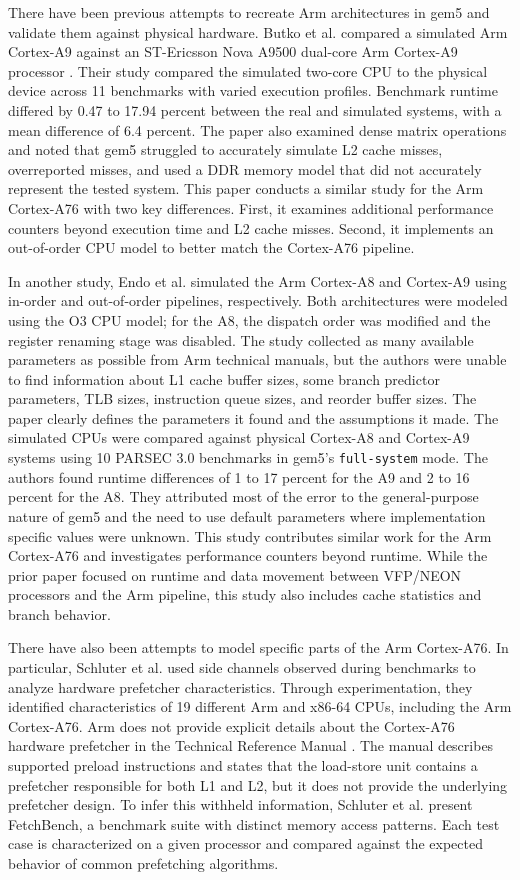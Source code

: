 \documentclass[acmlarge]{acmart}
\begin{document}
There have been previous attempts to recreate Arm architectures in gem5 and
validate them against physical hardware. Butko et al. compared a simulated Arm
Cortex-A9 against an ST-Ericsson Nova A9500 dual-core Arm Cortex-A9 processor
\cite{Butko2012-vg}. Their study compared the simulated two-core CPU to the
physical device across 11 benchmarks with varied execution profiles. Benchmark
runtime differed by 0.47 to 17.94 percent between the real and simulated systems,
with a mean difference of 6.4 percent. The paper also examined dense matrix
operations and noted that gem5 struggled to accurately simulate L2 cache misses,
overreported misses, and used a DDR memory model that did not accurately
represent the tested system. This paper conducts a similar study for the Arm
Cortex-A76 with two key differences. First, it examines additional performance
counters beyond execution time and L2 cache misses. Second, it implements an
out-of-order CPU model to better match the Cortex-A76 pipeline.

In another study, Endo et al. simulated the Arm Cortex-A8 and Cortex-A9 using
in-order and out-of-order pipelines, respectively\cite{Endo2014-ca}. Both
architectures were modeled using the O3 CPU model; for the A8, the dispatch order
was modified and the register renaming stage was disabled. The study collected as
many available parameters as possible from Arm technical manuals, but the authors
were unable to find information about L1 cache buffer sizes, some branch
predictor parameters, TLB sizes, instruction queue sizes, and reorder buffer
sizes. The paper clearly defines the parameters it found and the assumptions it
made. The simulated CPUs were compared against physical Cortex-A8 and Cortex-A9
systems using 10 PARSEC 3.0 benchmarks in gem5's \texttt{full-system} mode. The
authors found runtime differences of 1 to 17 percent for the A9 and 2 to 16
percent for the A8. They attributed most of the error to the general-purpose
nature of gem5 and the need to use default parameters where implementation
specific values were unknown. This study contributes similar work for the Arm
Cortex-A76 and investigates performance counters beyond runtime. While the prior
paper focused on runtime and data movement between VFP/NEON processors and the
Arm pipeline, this study also includes cache statistics and branch behavior.

There have also been attempts to model specific parts of the Arm Cortex-A76. In
particular, Schluter et al. used side channels observed during benchmarks to
analyze hardware prefetcher characteristics\cite{FetchBench}. Through
experimentation, they identified characteristics of 19 different Arm and x86-64
CPUs, including the Arm Cortex-A76. Arm does not provide explicit details about
the Cortex-A76 hardware prefetcher in the Technical Reference Manual
\cite{armCortexA76Product}. The manual describes supported preload instructions
and states that the load-store unit contains a prefetcher responsible for both
L1 and L2, but it does not provide the underlying prefetcher design. To infer
this withheld information, Schluter et al. present FetchBench, a benchmark suite
with distinct memory access patterns. Each test case is characterized on a given
processor and compared against the expected behavior of common prefetching
algorithms.
\end{document}
